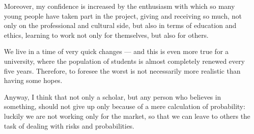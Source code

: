 Moreover, my confidence is increased by the enthusiasm with which so many young people have taken part in the project, giving and receiving so much, not only on the professional and cultural side, but also in terms of education and ethics, learning to work not only for themselves, but also for others.

We live in a time of very quick changes --- and this is even more true for a university, where the population of students is almost completely renewed every five years. Therefore, to foresee the worst is not necessarily more realistic than having some hopes.

Anyway, I think that not only a scholar, but any person who believes in something, should not give up only because of a mere calculation of probability: luckily we are not working only for the market, so that we can leave to others the task of dealing with risks and probabilities.


